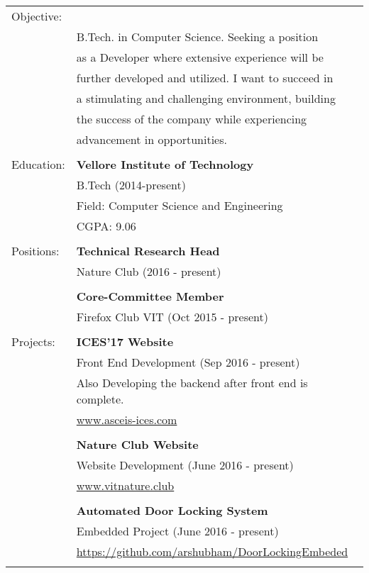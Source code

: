 \documentclass[letterpaper,11pt,oneside]{article}
\begin{document}
\noindent \begin{tabular}{@{} l l}
 \LARGE{Objective:}  &\noindent{Energetic and Passionate Student working towards}\\
 & B.Tech. in Computer Science. Seeking a position  \\
 & as a Developer where extensive experience will be \\ & further developed and utilized. I  want to succeed in\\
 & a stimulating and challenging 
 environment, building \\ & the success of the company  while experiencing\\ 
&  advancement in opportunities.\\
 &\\
 \LARGE{Education:}    & \textbf{Vellore Institute of Technology} \\
     & B.Tech (2014-present) \\
     & Field: Computer Science and Engineering \\
     & CGPA: 9.06 \\
     & \\
 \LARGE{Positions:}    &  \textbf{Technical Research Head} \\
    & Nature Club (2016 - present) \\
    & \\
    &  \textbf{Core-Committee Member}\\
    &  Firefox Club VIT (Oct 2015 - present) \\
    &  \\
 \LARGE{Projects:}    & \textbf{ICES'17 Website} \\
     & Front End Development (Sep 2016 - present) \\
     & Also Developing the backend after front end is complete. \\
     & \href{http://www.asceis-ices.com}{www.asceis-ices.com} \\
     & \\
     
      & \textbf{Nature Club Website} \\
     & Website Development (June 2016 - present) \\
     & \href{http://vitnature.club}{www.vitnature.club} \\
     & \\
     
     & \textbf{Automated Door Locking System} \\
     & Embedded Project (June 2016 - present) \\
     & \href{https://github.com/arshubham/DoorLockingEmbeded}{https://github.com/arshubham/DoorLockingEmbeded} \\
     & \\
     

\end{tabular}
\end{document}
